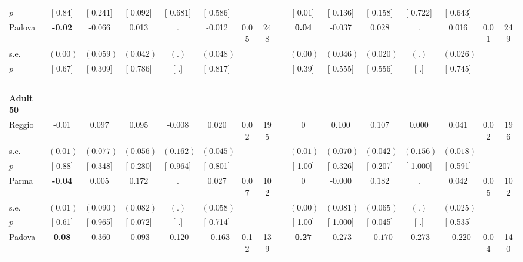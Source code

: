 \begin{longtable}{L{8em} c c c c c c c p{1em} c c c c c c c}
\quad \quad \quad \quad $ p$ & [     0.84] & [    0.241] & [    0.092] & [    0.681] & [    0.586] & & & & [     0.01] & [    0.136] & [    0.158] & [    0.722] & [    0.643] & &  \\[1em]
\quad \quad \quad Padova& \textbf{    -0.02} &    -0.066 &     0.013 &         . &    -0.012 &      0.05 &       248 & & \textbf{     0.04} &    -0.037 &     0.028 &         . &     0.016 &      0.01 &       249  \\*
\quad \quad \quad \quad s.e.& $ (     0.00)$ & $ (    0.059)$ & $ (    0.042)$ & $ (        .)$ & $ (    0.048)$ & & & & $ (     0.00)$ & $ (    0.046)$ & $ (    0.020)$ & $ (        .)$ & $ (    0.026)$ & &  \\*
\quad \quad \quad \quad $ p$ & [     0.67] & [    0.309] & [    0.786] & [        .] & [    0.817] & & & & [     0.39] & [    0.555] & [    0.556] & [        .] & [    0.745] & &  \\[1em]
~\\[1em]
\quad \quad \textbf{Adult 50} & & & & & & & & & & & & & & & \\* 
\quad \quad \quad Reggio& -0.01 &     0.097 &     0.095 &    -0.008 &     0.020 &      0.02 &       195 & & 0 &     0.100 &     0.107 &     0.000 &     0.041 &      0.02 &       196  \\*
\quad \quad \quad \quad s.e.& $ (     0.01)$ & $ (    0.077)$ & $ (    0.056)$ & $ (    0.162)$ & $ (    0.045)$ & & & & $ (     0.01)$ & $ (    0.070)$ & $ (    0.042)$ & $ (    0.156)$ & $ (    0.018)$ & &  \\*
\quad \quad \quad \quad $ p$ & [     0.88] & [    0.348] & [    0.280] & [    0.964] & [    0.801] & & & & [     1.00] & [    0.326] & [    0.207] & [    1.000] & [    0.591] & &  \\[1em]
\quad \quad \quad Parma& \textbf{    -0.04} &     0.005 & $ \mathbf{    0.172}$ &         . &     0.027 &      0.07 &       102 & & 0 &    -0.000 & $ \mathbf{    0.182}$ &         . &     0.042 &      0.05 &       102  \\*
\quad \quad \quad \quad s.e.& $ (     0.01)$ & $ (    0.090)$ & $ (    0.082)$ & $ (        .)$ & $ (    0.058)$ & & & & $ (     0.00)$ & $ (    0.081)$ & $ (    0.065)$ & $ (        .)$ & $ (    0.025)$ & &  \\*
\quad \quad \quad \quad $ p$ & [     0.61] & [    0.965] & [    0.072] & [        .] & [    0.714] & & & & [     1.00] & [    1.000] & [    0.045] & [        .] & [    0.535] & &  \\[1em]
\quad \quad \quad Padova& \textbf{     0.08} &    -0.360 &    -0.093 &    -0.120 & $ \mathbf{   -0.163}$ &      0.12 &       139 & & \textbf{     0.27} &    -0.273 & $ \mathbf{   -0.170}$ &    -0.273 & $ \mathbf{   -0.220}$ &      0.04 &       140  \\*

\end{longtable}
